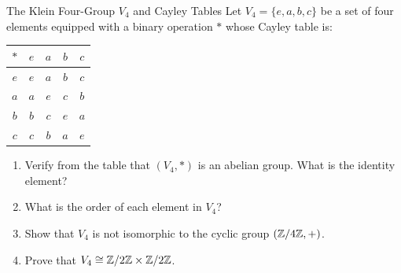 \begin{exercise}{The Klein Four-Group $V_4$ and Cayley Tables}
Let $V_4 = \{e, a, b, c\}$ be a set of four elements equipped with a binary operation $*$ whose Cayley table is:
\begin{center}
\begin{tabular}{c|cccc}
$*$ & $e$ & $a$ & $b$ & $c$ \\
\hline
$e$ & $e$ & $a$ & $b$ & $c$ \\
$a$ & $a$ & $e$ & $c$ & $b$ \\
$b$ & $b$ & $c$ & $e$ & $a$ \\
$c$ & $c$ & $b$ & $a$ & $e$
\end{tabular}
\end{center}
\begin{enumerate}[leftmargin=1.5em,itemsep=2pt]
  \item Verify from the table that $(V_4, *)$ is an abelian group. What is the identity element?
  \item What is the order of each element in $V_4$?
  \item Show that $V_4$ is not isomorphic to the cyclic group $(\mathbb{Z}/4\mathbb{Z}, +)$.
  \item Prove that $V_4 \cong \mathbb{Z}/2\mathbb{Z} \times \mathbb{Z}/2\mathbb{Z}$.
\end{enumerate}
\end{exercise}

\begin{tabletworkspace}[5.0cm]
\end{tabletworkspace}


